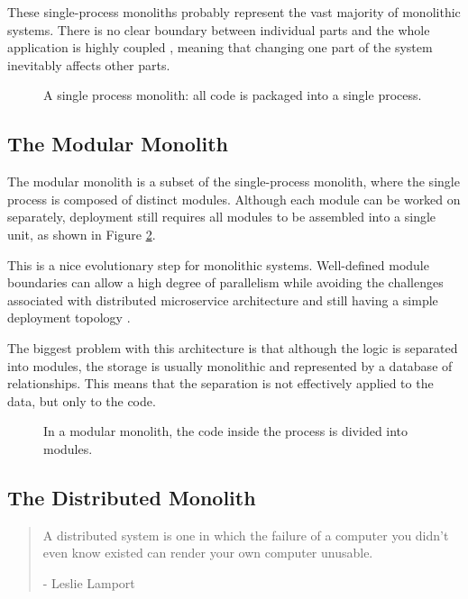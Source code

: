 These single-process monoliths probably represent the vast majority of monolithic systems. There is no clear boundary between individual parts and the whole application is highly coupled \cite{EVOLUTIONARY_ARCHITERUES_COUPLING}, meaning that changing one part of the system inevitably affects other parts.

\begin{figure}
    \centering
    
    \caption{A single process monolith: all code is packaged into a single process. \cite{MON_TO_MS_MONOLITH}\label{img:monolith_single_process}}
\end{figure}


\subsection{The Modular Monolith}
\label{section:modular_monolith}

The modular monolith is a subset of the single-process monolith, where the single process is composed of distinct modules. Although each module can be worked on separately, deployment still requires all modules to be assembled into a single unit, as shown in Figure \ref{img:monolith_single_process_modular}. \cite{BUILDING_MS_MONOLITH}

This is a nice evolutionary step for monolithic systems. Well-defined module boundaries can allow a high degree of parallelism while avoiding the challenges associated with distributed microservice architecture and still having a simple deployment topology \cite{BUILDING_MS_MONOLITH}.

The biggest problem with this architecture is that although the logic is separated into modules, the storage is usually monolithic and represented by a database of relationships. This means that the separation is not effectively applied to the data, but only to the code.


\begin{figure}
    \centering
    
    \caption{In a modular monolith, the code inside the process is divided into modules. \cite{BUILDING_MS_MONOLITH}\label{img:monolith_single_process_modular}}
\end{figure}


\subsection{The Distributed Monolith}
\begin{quote}
    A distributed system is one in which the failure of a computer you didn’t even know existed can render your own computer unusable. \cite{lamport1987distribution}
    \begin{flushright}
        - Leslie Lamport
    \end{flushright}
\end{quote}

